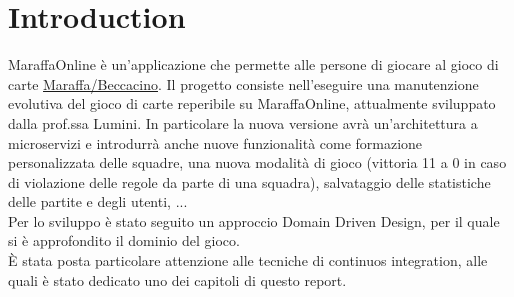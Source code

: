 \chapter{Introduction}
\label{ch:into} %
MaraffaOnline è un'applicazione che permette alle persone di giocare al gioco di carte \href{https://it.wikipedia.org/wiki/Marafone_Beccacino}{Maraffa/Beccacino}. 
Il progetto consiste nell’eseguire una manutenzione evolutiva del gioco di carte reperibile su MaraffaOnline, attualmente sviluppato dalla prof.ssa Lumini.
In particolare la nuova versione avrà un'architettura a microservizi e introdurrà anche nuove funzionalità come formazione personalizzata delle squadre, una nuova modalità 
di gioco (vittoria 11 a 0 in caso di violazione delle regole da parte di una squadra), salvataggio delle statistiche delle partite e degli utenti, ...
\\
Per lo sviluppo è stato seguito un approccio Domain Driven Design, per il quale si è approfondito il dominio del gioco.
\\
È stata posta particolare attenzione alle tecniche di continuos integration, alle quali è stato dedicato uno dei capitoli di questo report.



